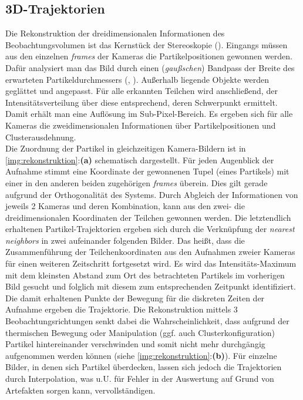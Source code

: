 \documentclass[numbers=noenddot,a4paper,notitlepage,twoside,BCOR15mm]{scrbook}
\newcommand{\tilt}[1]{\textit{#1}}
\newcommand{\fett}[1]{\textbf{#1}}
\begin{document}
				\subsection{3D-Trajektorien}

					Die Rekonstruktion der dreidimensionalen Informationen des Beobachtungsvolumen ist das Kernst\"uck der Stereoskopie (\cite{Bonitz10}). Eingangs m\"ussen aus den einzelnen \tilt{frames} der Kameras die Partikelpositionen gewonnen werden. Daf\"ur analysiert man das Bild durch einen (\tilt{gau{\ss}schen}) Bandpass der Breite des erwarteten Partikeldurchmessers (\cite{Crocker96a}, \cite{Ivanov07}). Au{\ss}erhalb liegende Objekte werden gegl\"attet und angepasst. F\"ur alle erkannten Teilchen wird anschlie{\ss}end, der Intensit\"atsverteilung \"uber diese entsprechend, deren Schwerpunkt ermittelt. Damit erhält man eine Auflösung im Sub-Pixel-Bereich. Es ergeben sich f\"ur alle Kameras die zweidimensionalen Informationen \"uber Partikelpositionen und Clusterausdehnung.\\
					Die Zuordnung der Partikel in gleichzeitigen Kamera-Bildern ist in \ref{img:rekonstruktion}:\fett{(a)} schematisch dargestellt. F\"ur jeden Augenblick der Aufnahme stimmt eine Koordinate der gewonnenen Tupel (eines Partikels) mit einer in den anderen beiden zugeh\"origen \tilt{frames} \"uberein. Dies gilt gerade aufgrund der Orthogonalität des Systems. Durch Abgleich der Informationen von jeweils 2 Kameras und deren Kombination, kann aus den zwei- die dreidimensionalen Koordinaten der Teilchen gewonnen werden. Die letztendlich erhaltenen Partikel-Trajektorien ergeben sich durch die Verknüpfung der \tilt{nearest neighbors} in zwei aufeinander folgenden Bilder. Das heißt, dass die Zusammenführung der Teilchenkoordinaten aus den Aufnahmen zweier Kameras für einen weiteren Zeitschritt fortgesetzt wird. Es wird das Intensitäts-Maximum mit dem kleinsten Abstand zum Ort des betrachteten Partikels im vorherigen Bild gesucht und folglich mit diesem zum entsprechenden Zeitpunkt identifiziert. Die damit erhaltenen Punkte der Bewegung für die diskreten Zeiten der Aufnahme ergeben die Trajektorie.
					Die Rekonstruktion mittels 3 Beobachtungsrichtungen senkt dabei die Wahrscheinlichkeit, dass aufgrund der thermischen Bewegung oder Manipulation (ggf. auch Clusterkonfiguration) Partikel hintereinander verschwinden und somit nicht mehr durchg\"angig aufgenommen werden k\"onnen (siehe \ref{img:rekonstruktion}:\fett{(b)}). F\"ur einzelne Bilder, in denen sich Partikel \"uberdecken, lassen sich jedoch die Trajektorien durch Interpolation, was u.U. f\"ur Fehler in der Auswertung auf Grund von Artefakten sorgen kann, vervollst\"andigen.
\end{document}
